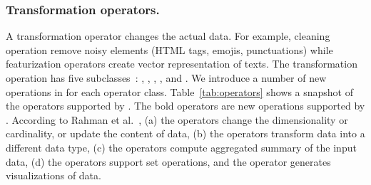 \subsubsection{Transformation operators.}
A transformation operator changes the actual data. For example, cleaning operation remove noisy elements (\eg HTML tags, emojis, punctuations) while featurization operators create vector representation of texts.
The transformation operation has five subclasses~\cite{rahman2020leam}: , , , , and . We introduce a number of new operations in \system for each operator class. Table~\ref{tab:operators} shows a snapshot of the operators supported by \system. The bold operators are new operations supported by \system. According to Rahman et al.~\cite{rahman2020leam}, (a) the  operators change the dimensionality or cardinality, or update the content of data, (b) the  operators transform data into a different data type, (c) the  operators compute aggregated summary of the input data, (d) the  operators support set operations, and the  operator generates visualizations of data. 

